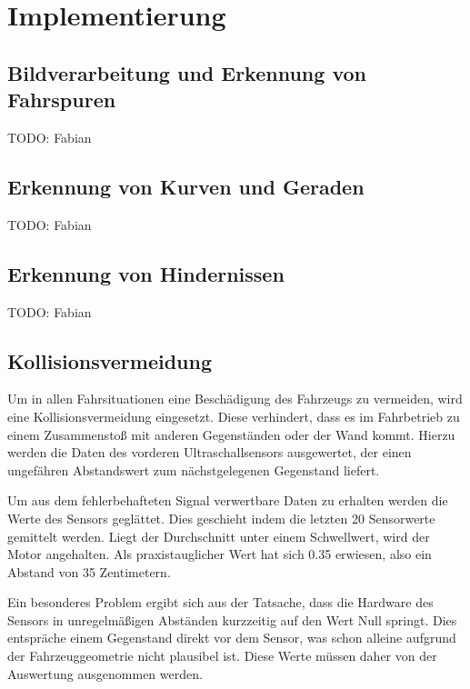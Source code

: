 \chapter{Implementierung}
\label{cha:Implementierung}
\section{Bildverarbeitung und Erkennung von Fahrspuren}
\label{sec:spurerkennung}

TODO: Fabian

\section{Erkennung von Kurven und Geraden}
\label{sec:kurvenerkennung}

TODO: Fabian

\section{Erkennung von Hindernissen}
\label{sec:hinderniserkennung}

TODO: Fabian

\section{Kollisionsvermeidung}
\label{sec:kollision}

Um in allen Fahrsituationen eine Beschädigung des Fahrzeugs zu vermeiden, wird eine Kollisionsvermeidung eingesetzt. Diese verhindert, dass es im Fahrbetrieb zu einem Zusammenstoß mit anderen Gegenständen oder der Wand kommt. Hierzu werden die Daten des vorderen Ultraschallsensors ausgewertet, der einen ungefähren Abstandswert zum nächstgelegenen Gegenstand liefert.

Um aus dem fehlerbehafteten Signal verwertbare Daten zu erhalten werden die Werte des Sensors geglättet. Dies geschieht indem die letzten 20 Sensorwerte gemittelt werden. Liegt der Durchschnitt unter einem Schwellwert, wird der Motor angehalten. Als praxistauglicher Wert hat sich 0.35 erwiesen, also ein Abstand von 35 Zentimetern.

Ein besonderes Problem ergibt sich aus der Tatsache, dass die Hardware des Sensors in unregelmäßigen Abständen kurzzeitig auf den Wert Null springt. Dies entspräche einem Gegenstand direkt vor dem Sensor, was schon alleine aufgrund der Fahrzeuggeometrie nicht plausibel ist. Diese Werte müssen daher von der Auswertung ausgenommen werden.

